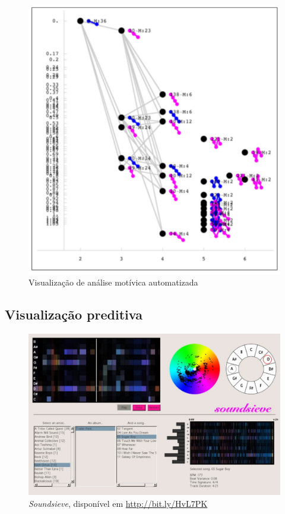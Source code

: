 \documentclass{sciposter}
\begin{document}
\begin{multicols}{2}
\begin{center}
\begin{figure}[!h]
  \centering
  \includegraphics{./figs/buteau-motivic.pdf}
  \caption{Visualização de análise motívica automatizada \cite{Buteau2005}}
  \label{fig:label-figura}
\end{figure}

\end{center}

\subsection{Visualização preditiva}

\begin{center}

\begin{figure}[!h]
  \centering
  \includegraphics{./figs/soundsieve.pdf}
  \caption{\textit{Soundsieve}, disponível em \url{http://bit.ly/HvL7PK}}
  \label{fig:label-figura}
\end{figure}


\end{center}
\end{multicols}
\end{document}
